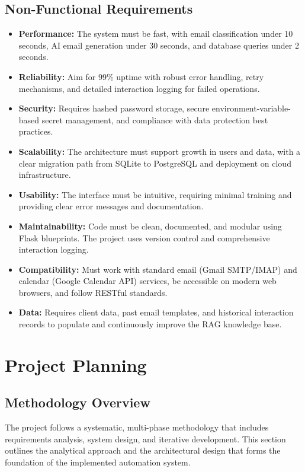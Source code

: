 \documentclass[12pt,a4paper]{report}
\begin{document}
\subsection{Non-Functional Requirements}
\begin{itemize}
    \item \textbf{Performance:} The system must be fast, with email classification under 10 seconds, AI email generation under 30 seconds, and database queries under 2 seconds.
    \item \textbf{Reliability:} Aim for 99\% uptime with robust error handling, retry mechanisms, and detailed interaction logging for failed operations.
    \item \textbf{Security:} Requires hashed password storage, secure environment-variable-based secret management, and compliance with data protection best practices.
    \item \textbf{Scalability:} The architecture must support growth in users and data, with a clear migration path from SQLite to PostgreSQL and deployment on cloud infrastructure.
    \item \textbf{Usability:} The interface must be intuitive, requiring minimal training and providing clear error messages and documentation.
    \item \textbf{Maintainability:} Code must be clean, documented, and modular using Flask blueprints. The project uses version control and comprehensive interaction logging.
    \item \textbf{Compatibility:} Must work with standard email (Gmail SMTP/IMAP) and calendar (Google Calendar API) services, be accessible on modern web browsers, and follow RESTful standards.
    \item \textbf{Data:} Requires client data, past email templates, and historical interaction records to populate and continuously improve the RAG knowledge base.
\end{itemize}

\section{Project Planning}

\subsection{Methodology Overview}
The project follows a systematic, multi-phase methodology that includes requirements analysis, system design, and iterative development. This section outlines the analytical approach and the architectural design that forms the foundation of the implemented automation system.
\end{document}
